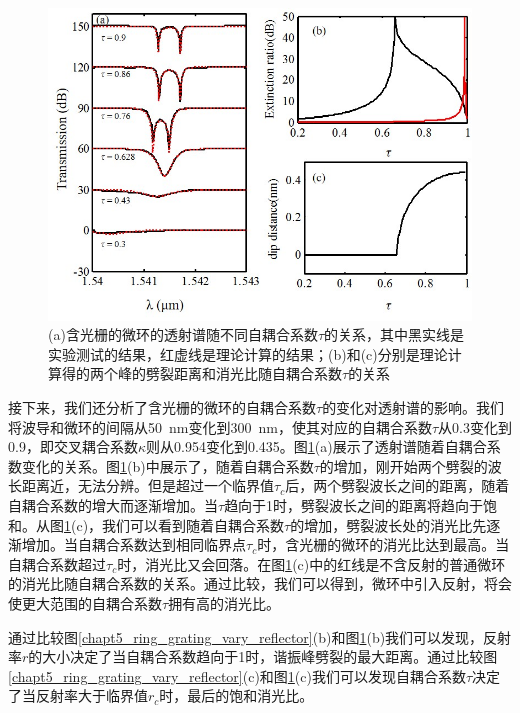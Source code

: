 \begin{figure}[htb]
	\centering
	\includegraphics[width=12cm]{./Pictures/chapt5_ring_grating_vary_tau.jpg}
	\caption{(a)含光栅的微环的透射谱随不同自耦合系数$\tau$的关系，其中黑实线是实验测试的结果，红虚线是理论计算的结果；(b)和(c)分别是理论计算得的两个峰的劈裂距离和消光比随自耦合系数$\tau$的关系}
	\label{chapt5_ring_grating_vary_tau}
\end{figure}

接下来，我们还分析了含光栅的微环的自耦合系数$\tau$的变化对透射谱的影响。我们将波导和微环的间隔从50~nm变化到300~nm，使其对应的自耦合系数$\tau$从0.3变化到0.9，即交叉耦合系数$\kappa$则从0.954变化到0.435。图\ref{chapt5_ring_grating_vary_tau}(a)展示了透射谱随着自耦合系数变化的关系。图\ref{chapt5_ring_grating_vary_tau}(b)中展示了，随着自耦合系数$\tau$的增加，刚开始两个劈裂的波长距离近，无法分辨。但是超过一个临界值$\tau_c$后，两个劈裂波长之间的距离，随着自耦合系数的增大而逐渐增加。当$\tau$趋向于1时，劈裂波长之间的距离将趋向于饱和。从图\ref{chapt5_ring_grating_vary_tau}(c)，我们可以看到随着自耦合系数$\tau$的增加，劈裂波长处的消光比先逐渐增加。当自耦合系数达到相同临界点$\tau_c$时，含光栅的微环的消光比达到最高。当自耦合系数超过$\tau_c$时，消光比又会回落。在图\ref{chapt5_ring_grating_vary_tau}(c)中的红线是不含反射的普通微环的消光比随自耦合系数的关系。通过比较，我们可以得到，微环中引入反射，将会使更大范围的自耦合系数$\tau$拥有高的消光比。

通过比较图\ref{chapt5_ring_grating_vary_reflector}(b)和图\ref{chapt5_ring_grating_vary_tau}(b)我们可以发现，反射率$r$的大小决定了当自耦合系数趋向于1时，谐振峰劈裂的最大距离。通过比较图\ref{chapt5_ring_grating_vary_reflector}(c)和图\ref{chapt5_ring_grating_vary_tau}(c)我们可以发现自耦合系数$\tau$决定了当反射率大于临界值$r_c$时，最后的饱和消光比。

